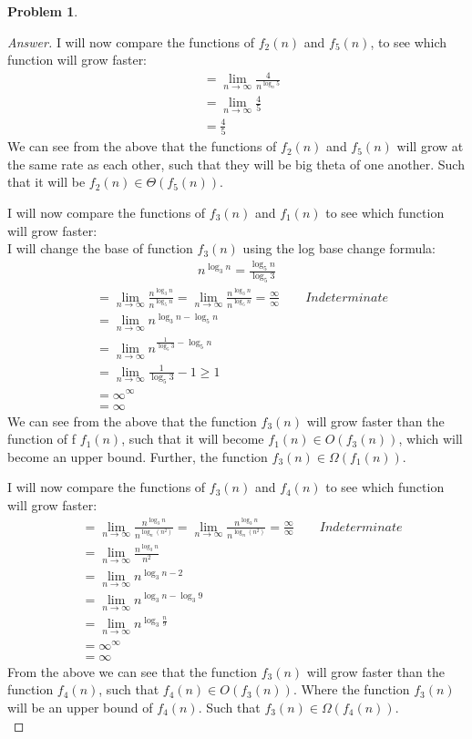 \documentclass[11pt]{article}
\theoremstyle{definition}
\theoremstyle{definition}
\newtheorem{required}{Problem}
\theoremstyle{definition}
\begin{document}
\begin{required}
\begin{enumerate}[label=(\alph*)]
\begin{proof}[Answer]
I will now compare the functions of $f_2(n)$ and $f_5(n)$, to see which function will grow faster: \\
\begin{align*}
&= \lim_{n \to \infty} \frac{4}{n^{\log_n 5}} \\
&= \lim_{n \to \infty} \frac{4}{5} \\
&= \frac {4}{5}
\end{align*} 
We can see from the above that the functions of $f_2(n)$ and $f_5(n)$ will grow at the same rate as each other, such that they will be big theta of one another. Such that it will be $f_2(n) \in \Theta(f_5(n))$.

I will now compare the functions of $f_3(n)$ and $f_1(n)$ to see which function will grow faster: \\
I will change the base of function $f_3(n)$ using the log base change formula:
\begin{align*}
n^{\log_3 n} = \frac{\log_5 n}{\log_5 3}
\end{align*}
\begin{align*}
&= \lim_{n \to \infty} \frac{n^{\log_3 n}}{n^{\log_5 n}} = \lim_{n \to \infty} \frac{n^{\log_3 n}}{n^{\log_5 n}}  = \frac{\infty}{\infty} \qquad Indeterminate  \\
&= \lim_{n \to \infty} n^{{\log_3 n}-{\log_5 n}} \\
&= \lim_{n \to \infty} n^{{\frac{1}{\log_5 3}}-{\log_5 n}} \\
&= \lim_{n \to \infty} \frac{1}{\log_5 3} - 1 \ge 1 \\
&= \infty^{\infty} \\
&= \infty
\end{align*} 
We can see from the above that the function $f_3(n)$ will grow faster than the function of f $f_1(n)$, such that it will become $f_1(n) \in O(f_3(n))$, which will become an upper bound. Further, the function $f_3(n) \in \Omega(f_1(n))$.

I will now compare the functions of $f_3(n)$ and $f_4(n)$ to see which function will grow faster: \\
\begin{align*}
&= \lim_{n \to \infty} \frac{n^{\log_3 n}}{n^{\log_n(n^2)}} = \lim_{n \to \infty} \frac{n^{\log_3 n}}{n^{\log_n(n^2)}}  = \frac{\infty}{\infty} \qquad Indeterminate  \\
&= \lim_{n \to \infty} \frac{n^{\log_3 n}}{n^2} \\
&= \lim_{n \to \infty} n^{{\log_3 n}-{2}} \\
&= \lim_{n \to \infty} n^{{\log_3 n}-{\log_3 9}} \\
&= \lim_{n \to \infty} n^{\log_3 \frac{n}{9}}\\
&= \infty^{\infty}\\
&= \infty
\end{align*} 
From the above we can see that the function $f_3(n)$ will grow faster than the function $f_4(n)$, such that $f_4(n) \in O(f_3(n))$. Where the function $f_3(n)$ will be an upper bound of $f_4(n)$. Such that $f_3(n) \in \Omega(f_4(n))$.\\


\end{proof}
\end{enumerate}
\end{required}
\end{document}
